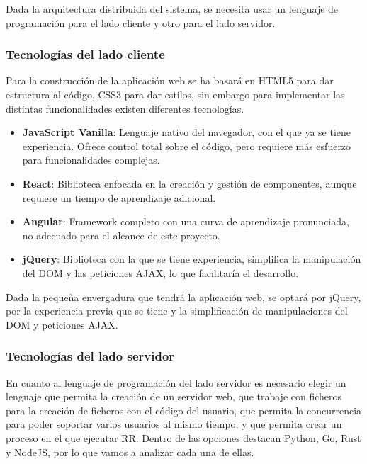 Dada la arquitectura distribuida del sistema, se necesita usar un lenguaje de programación para el lado cliente y otro para el lado servidor.

\subsubsection{Tecnologías del lado cliente} \label{sec:tecnologias-cliente}

Para la construcción de la aplicación web se ha basará en HTML5 para dar estructura al código, CSS3 para dar estilos, sin embargo para implementar las distintas funcionalidades existen diferentes tecnologías.

\begin{itemize}
    \item \textbf{JavaScript Vanilla}: Lenguaje nativo del navegador, con el que ya se tiene experiencia. Ofrece control total sobre el código, pero requiere más esfuerzo para funcionalidades complejas.
    \item \textbf{React}: Biblioteca enfocada en la creación y gestión de componentes, aunque requiere un tiempo de aprendizaje adicional.
    \item \textbf{Angular}: Framework completo con una curva de aprendizaje pronunciada, no adecuado para el alcance de este proyecto.
    \item \textbf{jQuery}: Biblioteca con la que se tiene experiencia, simplifica la manipulación del DOM y las peticiones AJAX, lo que facilitaría el desarrollo.
\end{itemize}

Dada la pequeña envergadura que tendrá la aplicación web, se optará por jQuery, por la experiencia previa que se tiene y la simplificación de manipulaciones del DOM y peticiones AJAX.

\subsubsection{Tecnologías del lado servidor} \label{sec:tecnologias-servidor}

En cuanto al lenguaje de programación del lado servidor es necesario elegir un lenguaje que permita la creación de un servidor web, que trabaje con ficheros para la creación de ficheros con el código del usuario, que permita la concurrencia para poder soportar varios usuarios al mismo tiempo, y que permita crear un proceso en el que ejecutar RR.
Dentro de las opciones destacan Python, Go, Rust y NodeJS, por lo que vamos a analizar cada una de ellas.

